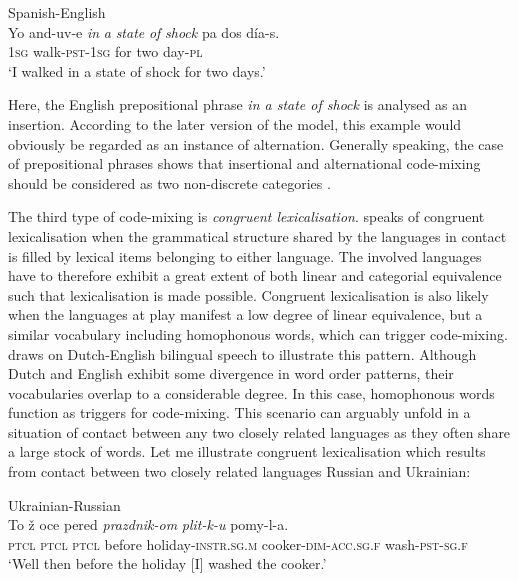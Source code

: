 \ea{\label{ex:1:5}}
Spanish-English \citep[296]{pfaff-1979}\\
\gll Yo and-uv-e \textit{in} \textit{a} \textit{state} \textit{of} \textit{shock} pa dos día-s.\\
 \textsc{1sg} walk-\textsc{pst-1sg} {} {} {} {} {} for two day-\textsc{pl}\\
\glt `I walked in a state of shock for two days.' 
\z

\noindent Here, the English prepositional phrase \textit{in a state of shock} is analysed as an insertion. According to the later version of the model, this example would obviously be regarded as an instance of alternation. Generally speaking, the case of prepositional phrases shows that insertional and alternational code-mixing should be considered as two non-discrete categories \citep[cf.][95]{backus-two-1996}.

The third type of code-mixing is \textit{congruent lexicalisation}. \citet[3--4]{muysken-bilingual-2000} speaks of congruent lexicalisation when the grammatical structure shared by the languages in contact is filled by lexical items belonging to either language. The involved languages have to therefore exhibit a great extent of both linear and categorial equivalence such that lexicalisation is made possible. Congruent lexicalisation is also likely when the languages at play manifest a low degree of linear equivalence, but a similar vocabulary including homophonous words, which can trigger code-mixing. \citet[][123]{muysken-bilingual-2000} draws on Dutch-English bilingual speech to illustrate this pattern. Although Dutch and English exhibit some divergence in word order patterns, their vocabularies overlap to a considerable degree. In this case, homophonous words function as triggers for code-mixing. This scenario can arguably unfold in a situation of contact between any two closely related languages as they often share a large stock of words. Let me illustrate congruent lexicalisation which results from contact between two closely related languages Russian and Ukrainian:

\ea{\label{ex:1:6}}
Ukrainian-Russian \citep{vahtin-novye-2003}\\
\gll To ž oce pered \textit{prazdnik-om} \textit{plit-k-u} pomy-l-a.\\
	\textsc{ptcl} \textsc{ptcl} \textsc{ptcl} before holiday-\textsc{instr.sg.m} cooker-\textsc{dim}-\textsc{acc.sg.f} wash-\textsc{pst-sg.f}\\
\glt `Well then before the holiday [I] washed the cooker.' 
\z

